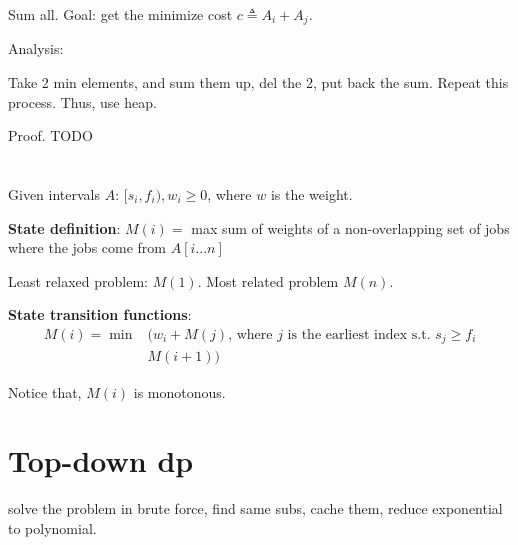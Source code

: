 \documentclass[a4paper]{report}
\begin{document}
Sum all. Goal: get the minimize cost $c\triangleq A_i+A_j$.

Analysis:

Take 2 min elements, and sum them up, del the 2, put back the sum. Repeat this process. Thus, use heap. 

Proof. TODO

\section{}
Given intervals $A$: $[s_i, f_i), w_i\geq 0$, where $w$ is the weight. 

\textbf{State definition}:
$M(i)=$ max sum of weights of a non-overlapping set of jobs where the jobs come from $A[i...n]$

Least relaxed problem: $M(1)$. Most related problem $M(n)$.

\textbf{State transition functions}:
\begin{align*}
M(i) = \min&\Big( w_i+M(j) \text{, where $j$ is the earliest index s.t. } s_j\geq f_i\\
&M(i+1)\Big)
\end{align*}

Notice that, $M(i)$ is monotonous.

\section{Top-down dp}
solve the problem in brute force, find same subs, cache them, reduce exponential to polynomial. 
\end{document}
